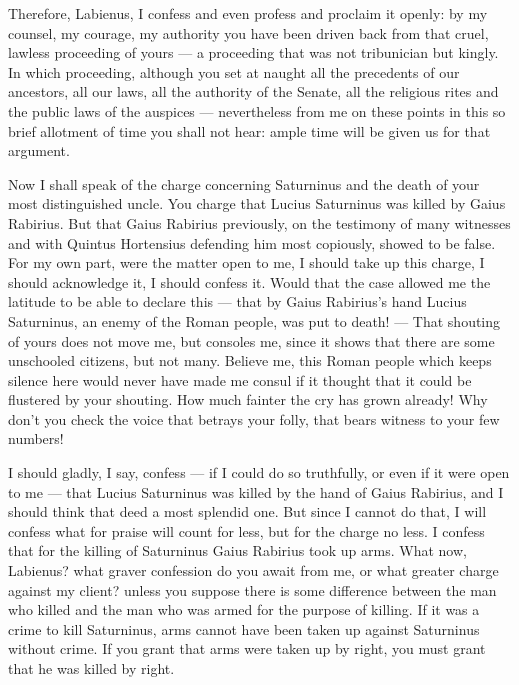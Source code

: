 Therefore, Labienus, I confess and even profess and proclaim it openly: by my counsel, my courage, my authority you have been driven back from that cruel, lawless proceeding of yours --- a proceeding that was not tribunician but kingly. In which proceeding, although you set at naught all the precedents of our ancestors, all our laws, all the authority of the Senate, all the religious rites and the public laws of the auspices --- nevertheless from me on these points in this so brief allotment of time you shall not hear: ample time will be given us for that argument.

 Now I shall speak of the charge concerning Saturninus and the death of your most distinguished uncle. You charge that Lucius Saturninus was killed by Gaius Rabirius. But that Gaius Rabirius previously, on the testimony of many witnesses and with Quintus Hortensius defending him most copiously, showed to be false. For my own part, were the matter open to me, I should take up this charge, I should acknowledge it, I should confess it. Would that the case allowed me the latitude to be able to declare this --- that by Gaius Rabirius's hand Lucius Saturninus, an enemy of the Roman people, was put to death! --- That shouting of yours does not move me, but consoles me, since it shows that there are some unschooled citizens, but not many. Believe me, this Roman people which keeps silence here would never have made me consul if it thought that it could be flustered by your shouting. How much fainter the cry has grown already! Why don't you check the voice that betrays your folly, that bears witness to your few numbers!

 I should gladly, I say, confess --- if I could do so truthfully, or even if it were open to me --- that Lucius Saturninus was killed by the hand of Gaius Rabirius, and I should think that deed a most splendid one. But since I cannot do that, I will confess what for praise will count for less, but for the charge no less. I confess that for the killing of Saturninus Gaius Rabirius took up arms. What now, Labienus? what graver confession do you await from me, or what greater charge against my client? unless you suppose there is some difference between the man who killed and the man who was armed for the purpose of killing. If it was a crime to kill Saturninus, arms cannot have been taken up against Saturninus without crime. If you grant that arms were taken up by right, you must grant that he was killed by right.


